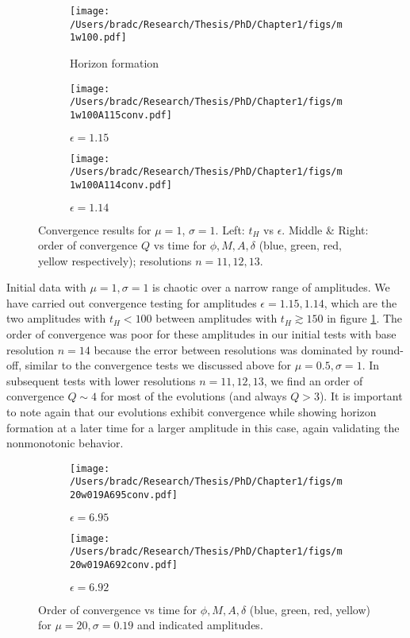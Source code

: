 \documentclass[../PhD.tex]{subfiles}
\begin{document}
\begin{subappendices}
\begin{figure}[!t]
\centering
\begin{subfigure}[t]{0.31\textwidth}
\texttt{[image: /Users/bradc/Research/Thesis/PhD/Chapter1/figs/m1w100.pdf]}
\caption{Horizon formation}
\label{f:m1w100}
\end{subfigure}
\begin{subfigure}[t]{0.31\textwidth}
\texttt{[image: /Users/bradc/Research/Thesis/PhD/Chapter1/figs/m1w100A115conv.pdf]}
\caption{$\epsilon=1.15$}
\label{f:m1w100A115conv}
\end{subfigure}
\begin{subfigure}[t]{0.31\textwidth}
\texttt{[image: /Users/bradc/Research/Thesis/PhD/Chapter1/figs/m1w100A114conv.pdf]}
\caption{$\epsilon=1.14$}
\label{f:m1w100A114conv}
\end{subfigure}
\caption[Order of convergence for $\phi$, $M$, $A$, $\delta$ as a function of time for $\mu = 1$ at nearby amplitudes]{Convergence results for $\mu=1$, $\sigma=1$. Left: $t_H$ vs $\epsilon$.
Middle \& Right: order of convergence $Q$ vs time for $\phi,M,A,\delta$ 
(blue, green, red, yellow respectively); resolutions $n=11,12,13$.
}
\label{f:m1w100convergence}
\end{figure}

Initial data with $\mu=1,\sigma=1$ is chaotic over a narrow range of 
amplitudes.  We have carried out convergence testing for amplitudes 
$\epsilon=1.15,1.14$, which are the two amplitudes with $t_H<100$ between
amplitudes with $t_H\gtrsim 150$ in figure \ref{f:m1w100}.  The order of
convergence was poor for these amplitudes in our initial tests with base
resolution $n=14$ because the error between resolutions was dominated by 
round-off, similar to the convergence tests we discussed above for
$\mu=0.5,\sigma=1$.  In subsequent tests with lower resolutions $n=11,12,13$,
we find an order of convergence $Q\sim 4$ for most of the evolutions
(and always $Q>3$). It is important to note again
that our evolutions exhibit convergence while showing horizon formation at 
a later time for a larger amplitude in this case, again validating the
nonmonotonic behavior.


\begin{figure}[!t]
\centering
\begin{subfigure}[t]{0.47\textwidth}
\texttt{[image: /Users/bradc/Research/Thesis/PhD/Chapter1/figs/m20w019A695conv.pdf]}
\caption{$\epsilon=6.95$}
\label{f:m20w019A695conv}
\end{subfigure}
\begin{subfigure}[t]{0.47\textwidth}
\texttt{[image: /Users/bradc/Research/Thesis/PhD/Chapter1/figs/m20w019A692conv.pdf]}
\caption{$\epsilon=6.92$}
\label{f:m20w019A692conv}
\end{subfigure}
\caption[Order of convergence for $\phi$, $M$, $A$, $\delta$ as a function of time for $\mu = 20$ at nearby amplitudes]{Order of convergence vs time for $\phi,M,A,\delta$ (blue, green, red,
yellow) for $\mu=20,\sigma=0.19$ and indicated amplitudes. 
}
\label{f:m20w019convergence}
\end{figure}



\end{subappendices}
\end{document}
